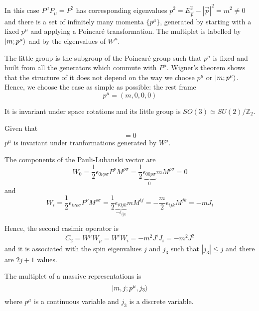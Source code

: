    In this case $P^\mu P_\mu = P^2$ has corresponding eigenvalues $p^2 = E_{\vec p}^2 - |\vec p|^2 = m^2 \neq 0$ and there is a set of infinitely many momenta $\{p^\mu\}$, generated by starting with a fixed $p^\mu$ and applying a Poincaré transformation. The multiplet is labelled by $\vert m ; p^\mu\rangle$ and by the eigenvalues of $W^\mu$. 

    The little group is the subgroup of the Poincaré group such that $p^\mu$ is fixed and built from all the generators which commute with $P^\mu$. Wigner's theorem shows that the structure of it does not depend on the way we choose $p^\mu$ or $\vert m ; p^\mu\rangle$. Hence, we choose the case as simple as possible: the rest frame 
    \begin{equation*}
        p^\mu = (m, 0, 0, 0)
    \end{equation*}

    It is invariant under space rotations and its little group is $SO(3) \simeq SU(2) / \mathbb Z_2$. 

    Given that 
    \begin{equation*}
        [P^\mu, W_\mu] = 0
    \end{equation*}
    $p^\mu$ is invariant under tranformations generated by $W^\mu$.

    The components of the Pauli-Lubanski vector are 
    \begin{equation*}
        W_0 = \frac{1}{2} \epsilon_{0 \nu \rho \sigma} P^\nu M^{\rho \sigma}= \frac{1}{2} \underbrace{\epsilon_{0 0 \rho \sigma}}_{0} m M^{\rho \sigma} = 0
    \end{equation*}
    and 
    \begin{equation*}
        W_i = \frac{1}{2} \epsilon_{i \nu \rho \sigma} P^\nu M^{\rho \sigma} = \frac{1}{2} \underbrace{\epsilon_{i 0 jk}}_{- \epsilon_{ijk}} m M^{ij} = - \frac{m}{2} \epsilon_{ijk} M^{jk} = - m J_i
    \end{equation*}

    Hence, the second casimir operator is 
    \begin{equation*}
        C_2 = W^\mu W_\mu = W^i W_i = - m^2 J^i J_i = - m^2 J^2
    \end{equation*}
    and it is associated with the spin eigenvalues $j$ and $j_3$ such that $|j_3| \leq j$ and there are $2j+1$ values. 

    The multiplet of a massive representations is 
    \begin{equation*}
        \vert m, j ; p^\mu, j_3\rangle
    \end{equation*}
    where $p^\mu$ is a continuous variable and $j_3$ is a discrete variable. 

